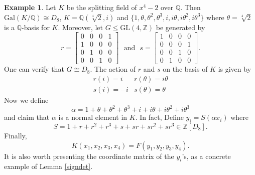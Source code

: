 \documentclass{article}
\theoremstyle{plain}
\theoremstyle{definition}
\newtheorem{example}[theorem]{Example}
\newcommand{\Z}{\ensuremath{\mathbb{Z}}}
\newcommand{\Q}{\ensuremath{\mathbb{Q}}}
\begin{document}
\begin{example}
Let $K$ be the splitting field of $x^4-2$ over $\Q$. Then $\mathrm{Gal}(K/\Q) \cong D_8$, $K = \Q(\sqrt[4]{2},i)$ and $\lbrace 1, \theta, \theta^2, \theta^3, i, i\theta, i\theta^2, i\theta^3\rbrace$ where  $\theta = \sqrt[4]{2}$ is a $\Q$-basis for $K$. Moreover, let $G\leq \mathrm{GL}(4,\Z)$ be generated by 
$$
r = \begin{bmatrix}
0&0&0&1\\
1&0&0&0\\
0&1&0&0\\
0&0&1&0
\end{bmatrix} \,\,\,\, \text{and}\,\,\,\,
s = \begin{bmatrix}
1&0&0&0\\
0&0&0&1\\
0&0&1&0\\
0&1&0&0
\end{bmatrix}.
$$
One can verify that $G \cong D_8$. The action of $r$ and $s$ on the basis of $K$ is given by
$$
\begin{matrix}
r(i) = i &r(\theta) = i \theta \\
s(i) = -i & s(\theta) = \theta
\end{matrix}
$$
Now we define $$\alpha = 1+ \theta + \theta^2 + \theta^3 +i + i\theta + i\theta^2 + i\theta^3$$
and claim that $\alpha$ is a normal element in $K$. In fact, 
Define $y_i = S(\alpha x_i)$ where $$S = 1+r+r^2+r^3+s+sr+sr^2+sr^3 \in \Z[D_8].$$ Finally, $$K(x_1, x_2, x_3,x_4) = F(y_1,y_2,y_3,y_4).$$
It is also worth presenting the coordinate matrix of the $y_i$'s, as a concrete example of Lemma \ref{signdet}. 

\end{example}
\end{document}
